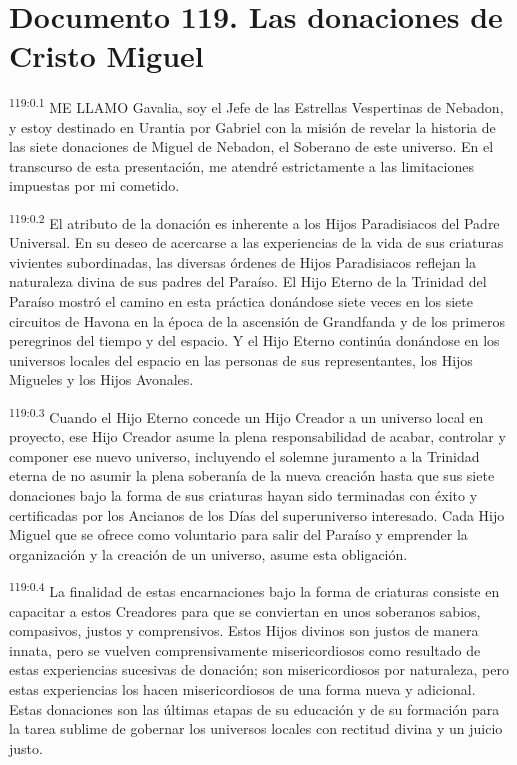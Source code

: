 \chapter{Documento 119. Las donaciones de Cristo Miguel}
\par
\textsuperscript{119:0.1} ME LLAMO Gavalia, soy el Jefe de las Estrellas Vespertinas de Nebadon, y estoy destinado en Urantia por Gabriel con la misión de revelar la historia de las siete donaciones de Miguel de Nebadon, el Soberano de este universo. En el transcurso de esta presentación, me atendré estrictamente a las limitaciones impuestas por mi cometido.

\par
\textsuperscript{119:0.2} El atributo de la donación es inherente a los Hijos Paradisiacos del Padre Universal. En su deseo de acercarse a las experiencias de la vida de sus criaturas vivientes subordinadas, las diversas órdenes de Hijos Paradisiacos reflejan la naturaleza divina de sus padres del Paraíso. El Hijo Eterno de la Trinidad del Paraíso mostró el camino en esta práctica donándose siete veces en los siete circuitos de Havona en la época de la ascensión de Grandfanda y de los primeros peregrinos del tiempo y del espacio. Y el Hijo Eterno continúa donándose en los universos locales del espacio en las personas de sus representantes, los Hijos Migueles y los Hijos Avonales.

\par
\textsuperscript{119:0.3} Cuando el Hijo Eterno concede un Hijo Creador a un universo local en proyecto, ese Hijo Creador asume la plena responsabilidad de acabar, controlar y componer ese nuevo universo, incluyendo el solemne juramento a la Trinidad eterna de no asumir la plena soberanía de la nueva creación hasta que sus siete donaciones bajo la forma de sus criaturas hayan sido terminadas con éxito y certificadas por los Ancianos de los Días del superuniverso interesado. Cada Hijo Miguel que se ofrece como voluntario para salir del Paraíso y emprender la organización y la creación de un universo, asume esta obligación.

\par
\textsuperscript{119:0.4} La finalidad de estas encarnaciones bajo la forma de criaturas consiste en capacitar a estos Creadores para que se conviertan en unos soberanos sabios, compasivos, justos y comprensivos. Estos Hijos divinos son justos de manera innata, pero se vuelven comprensivamente misericordiosos como resultado de estas experiencias sucesivas de donación; son misericordiosos por naturaleza, pero estas experiencias los hacen misericordiosos de una forma nueva y adicional. Estas donaciones son las últimas etapas de su educación y de su formación para la tarea sublime de gobernar los universos locales con rectitud divina y un juicio justo.


